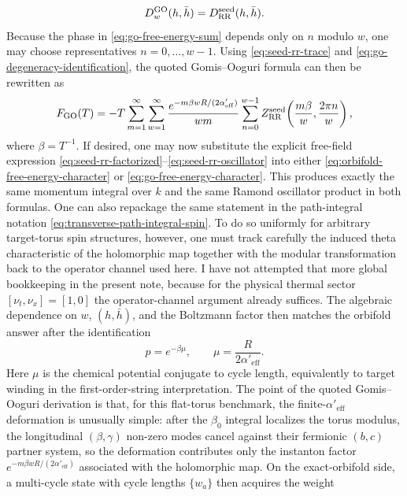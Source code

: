 \documentclass[11pt]{article}
\newcommand{\Aeff}{\alpha'_{\mathrm{eff}}}
\begin{document}
\begin{equation}\label{eq:go-degeneracy-identification}
D_w^{\mathrm{GO}}(h,\bar h)=D_{\rm RR}^{\mathrm{seed}}(h,\bar h).
\end{equation}
Because the phase in \eqref{eq:go-free-energy-sum} depends only on $n$ modulo $w$, one may choose representatives $n=0,\dots,w-1$. Using \eqref{eq:seed-rr-trace} and \eqref{eq:go-degeneracy-identification}, the quoted Gomis--Ooguri formula can then be rewritten as
\begin{equation}\label{eq:go-free-energy-character}
F_{\mathrm{GO}}(T)
=
-T\sum_{m=1}^\infty \sum_{w=1}^\infty \frac{e^{-m\beta wR/(2\Aeff)}}{wm}
\sum_{n=0}^{w-1}
Z_{\rm RR}^{\mathrm{seed}}\!\left(\frac{m\beta}{w},\frac{2\pi n}{w}\right),
\end{equation}
where $\beta=T^{-1}$.
If desired, one may now substitute the explicit free-field expression \eqref{eq:seed-rr-factorized}--\eqref{eq:seed-rr-oscillator} into either \eqref{eq:orbifold-free-energy-character} or \eqref{eq:go-free-energy-character}. This produces exactly the same momentum integral over $k$ and the same Ramond oscillator product in both formulas.
One can also repackage the same statement in the path-integral notation \eqref{eq:transverse-path-integral-spin}. To do so uniformly for arbitrary target-torus spin structures, however, one must track carefully the induced theta characteristic of the holomorphic map together with the modular transformation back to the operator channel used here. I have not attempted that more global bookkeeping in the present note, because for the physical thermal sector $[\nu_t,\nu_x]=[1,0]$ the operator-channel argument already suffices.
The algebraic dependence on $w$, $(h,\bar h)$, and the Boltzmann factor then matches the orbifold answer after the identification
\begin{equation}\label{eq:chemical-potential}
p=e^{-\beta\mu},
\qquad
\mu=\frac{R}{2\Aeff}.
\end{equation}
Here $\mu$ is the chemical potential conjugate to cycle length, equivalently to target winding in the first-order-string interpretation. The point of the quoted Gomis--Ooguri derivation is that, for this flat-torus benchmark, the finite-$\Aeff$ deformation is unusually simple: after the $\beta_0$ integral localizes the torus modulus, the longitudinal $(\beta,\gamma)$ non-zero modes cancel against their fermionic $(b,c)$ partner system, so the deformation contributes only the instanton factor $e^{-m\beta wR/(2\Aeff)}$ associated with the holomorphic map. On the exact-orbifold side, a multi-cycle state with cycle lengths $\{w_a\}$ then acquires the weight
\end{document}

